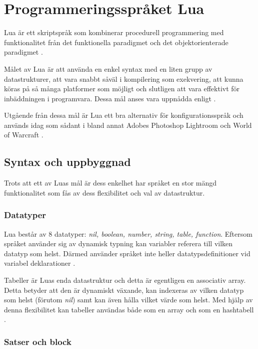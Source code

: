 
\section{Programmeringsspråket Lua}

Lua är ett skriptspråk som kombinerar procedurell programmering med
funktionalitet från det funktionella paradigmet och det objektorienterade
paradigmet \citep{luaimp}.

Målet av Lua är att använda en enkel syntax med en liten grupp av
datastrukturer, att vara snabbt såväl i kompilering som exekvering, att kunna
köras på så många platformer som möjligt och slutligen att vara effektivt för
inbäddningen i programvara. Dessa mål anses vara uppnådda enligt \cite{luaimp}.

Utgående från dessa mål är Lua ett bra alternativ för konfigurationsspråk och
används idag som sådant i bland annat Adobes Photoshop Lightroom och World of
Warcraft \citep{lua}.

\subsection{Syntax och uppbyggnad}

Trots att ett av Luas mål är dess enkelhet har språket en stor mängd
funktionalitet som fås av dess flexibilitet och val av datastruktur.

\subsubsection{Datatyper}

Lua består av 8 datatyper: \textit{nil, boolean, number, string, table,
  function}. Eftersom språket använder sig av dynamisk typning kan variabler
referera till vilken datatyp som helst. Därmed använder språket inte heller
datatypsdefinitioner vid variabel deklarationer \citep[s. 9]{ir06}.

Tabeller är Luas enda datastruktur och detta är egentligen en associativ
array. Detta betyder att den är dynamiskt växande, kan indexeras av vilken
datatyp som helst (förutom \textit{nil}) samt kan även hålla vilket värde som
helst. Med hjälp av denna flexibilitet kan tabeller användas både som en array
och som en hashtabell \citep[s. 15]{ir06}.

\subsubsection{Satser och block}

